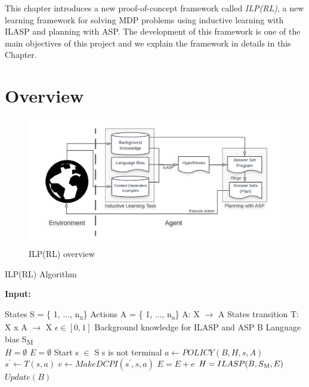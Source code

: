 This chapter introduces a new proof-of-concept framework called \textit{ILP(RL)}, a new learning framework for solving MDP problems using inductive learning with ILASP and planning with ASP.
The development of this framework is one of the main objectives of this project and we explain the framework in details in this Chapter.

\section{Overview}
\label{sec:overview}

\begin{figure}[!htb]
\centering
\includegraphics[width=1.0\textwidth]{./figures/architecture}
\caption{ILP(RL) overview}
\label{fig:ILPRL_overview}
\end{figure}

\begin{algorithm}
\caption{ILP(RL) Algorithm}\label{euclid}
\begin{algorithmic}[1]
\renewcommand{\algorithmicrequire}{\textbf{Input:}}
\State \textbf{Input:} \\
\State
 
\State States S = \{ 1, ..., n\textsubscript{x}\}
\State Actions A = \{ 1, ..., n\textsubscript{a}\} A: X $\rightarrow$ A
\State States transition T: X x A $\rightarrow$ X
\State $\epsilon \in [0,1]$
\State Background knowledge for ILASP and ASP B
\State Language bias S\textsubscript{M} \\

\State $H = \emptyset$
\State $E = \emptyset$
\State Start s $\in$ S
\While s is not terminal 
\State $a \leftarrow POLICY(B, H, s, A)$ \\
\space
{}
\State $s^\prime \leftarrow T(s,a)$
\space
{}
\State $e \leftarrow MakeDCPI(s^\prime, s, a) $ 
\State $E = E + e$
\space
{}
\State $H = ILASP(B, S\textsubscript{M}, E)$
\EndIf
\State $Update(B)$
\EndWhile
\EndProcedure
\end{algorithmic}
\end{algorithm}

